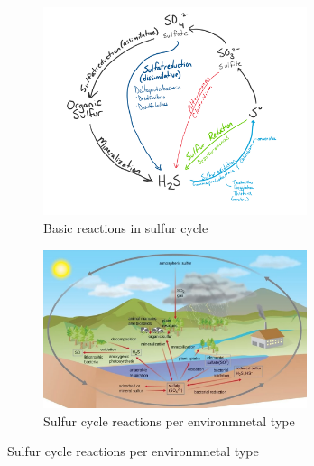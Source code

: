       \begin{figure}[!h]
         \centering

         \begin{subfigure}{0.85\textwidth}
            \includegraphics[width=0.85\textwidth]{figures/Sulfur_Cycle_for_Hydrothermal_Vents.png}
            \caption{Basic reactions in sulfur cycle} 
            \label{fig:micr_ecol_a}
         \end{subfigure}%
         
         \hspace*{\fill}   %

         \begin{subfigure}{0.85\textwidth}
            \includegraphics[width=0.85\textwidth]{figures/sulfur_village.png}
            \caption{Sulfur cycle reactions per environmnetal type} 
            \label{fig:micr_ecol_b}
         \end{subfigure}%
         
         \hspace*{\fill}
         

\end{figure}

